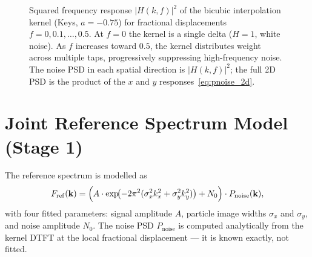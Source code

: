 \documentclass[11pt,a4paper]{article}
\newcommand{\kv}{\mathbf{k}}
\newcommand{\Fref}{F_\mathrm{ref}}
\newcommand{\Pnoise}{P_\mathrm{noise}}
\begin{document}
\begin{figure}[t]
\caption{%
Squared frequency response $\lvert H(k,f)\rvert^2$ of the bicubic interpolation kernel (Keys, $a = -0.75$) for fractional displacements $f = 0, 0.1, \ldots, 0.5$.
At $f = 0$ the kernel is a single delta ($H = 1$, white noise).
As $f$ increases toward $0.5$, the kernel distributes weight across multiple taps, progressively suppressing high-frequency noise.
The noise PSD in each spatial direction is $\lvert H(k,f)\rvert^2$; the full 2D PSD is the product of the $x$ and $y$ responses~\eqref{eq:pnoise_2d}.
}
\label{fig:kernel_response}
\end{figure}

\section{Joint Reference Spectrum Model (Stage 1)}
\label{sec:stage1}

The reference spectrum is modelled as
%
\begin{equation}
    \Fref(\kv) = \Bigl(A \cdot \exp\!\bigl(-2\pi^2(\sigma_x^2 k_x^2 + \sigma_y^2 k_y^2)\bigr) + N_0\Bigr) \cdot \Pnoise(\kv),
    \label{eq:stage1_model}
\end{equation}
%
with four fitted parameters: signal amplitude $A$, particle image widths $\sigma_x$ and $\sigma_y$, and noise amplitude $N_0$.
The noise PSD $\Pnoise$ is computed analytically from the kernel DTFT at the local fractional displacement --- it is known exactly, not fitted.
\end{document}
